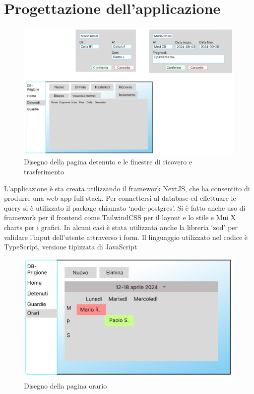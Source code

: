 \documentclass[a4paper,12pt]{report}
\begin{document}
\section{Progettazione dell'applicazione}
\begin{figure}[H]
\caption{Disegno della pagina detenuto e le finestre di ricovero e trasferimento}
\includegraphics[scale=0.6]{progettazione_applicazione.png}
\end{figure}
L'applicazione è sta creata utilizzando il framework NextJS, che ha consentito di produrre una web-app full stack.
%
Per connettersi al database ed effettuare le query si è utilizzato il package chiamato `node-postgres'.
%
Si è fatto anche uso di framework per il frontend come TailwindCSS per il layout e lo stile e Mui X charts per i grafici.
%
In alcuni casi è stata utilizzata anche la libreria `zod' per validare l'input dell'utente attraverso i form.
%
Il linguaggio utilizzato nel codice è TypeScript, versione tipizzata di JavaScript

\begin{figure}[H]
\caption{Disegno della pagina orario} 
\includegraphics[width=\textheight,keepaspectratio, angle=90,origin=c]{progettazione_orari.png} 
\end{figure}
\end{document}
